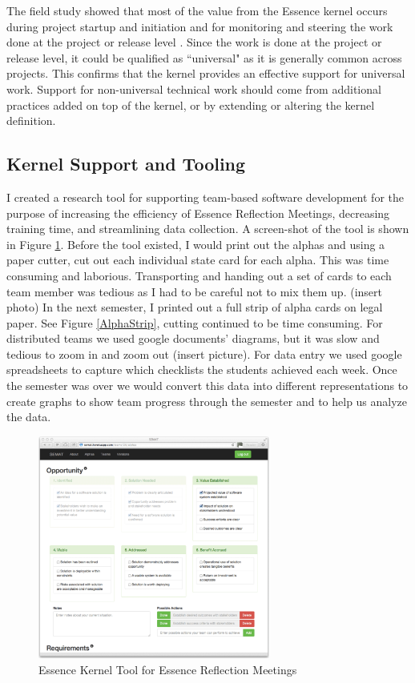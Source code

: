 \documentclass[preprint,12pt,3p]{elsarticle}
\begin{document}
The field study showed that most of the value from the Essence kernel occurs during project startup and initiation and for monitoring and steering the work done at the project or release level \cite{ICSE2014}. Since the work is done at the project or release level, it could be qualified as ``universal" as it is generally common across projects. This confirms that the kernel provides an effective support for universal work. Support for non-universal technical work should come from additional practices added on top of the kernel, or by extending or altering the kernel definition.

\subsection{Kernel Support and Tooling}
\label{EssenceTool}
I created a research tool for supporting team-based software development for the purpose of increasing the efficiency of Essence Reflection Meetings, decreasing training time, and streamlining data collection. A screen-shot of the tool is shown in Figure \ref{EssenceToolScreenshot}. Before the tool existed, I would print out the alphas and using a paper cutter, cut out each individual state card for each alpha. This was time consuming and laborious. Transporting and handing out a set of cards to each team member was tedious as I had to be careful not to mix them up. (insert photo) In the next semester, I printed out a full strip of alpha cards on legal paper. See Figure \ref{AlphaStrip}, cutting continued to be time consuming. For distributed teams we used google documents' diagrams, but it was slow and tedious to zoom in and zoom out (insert picture). For data entry we used google spreadsheets to capture which checklists the students achieved each week. Once the semester was over we would convert this data into different representations to create graphs to show team progress through the semester and to help us analyze the data.  

\begin{figure}[ht]
\centering
\includegraphics[width=3.00in]{tool_photos/tool_photo}
\caption{Essence Kernel Tool for Essence Reflection Meetings}
\label{EssenceToolScreenshot}
\end{figure}
\end{document}
